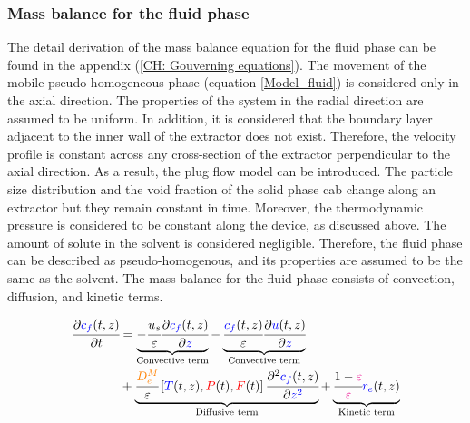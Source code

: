 \documentclass[../Article_Model_Parameters.tex]{subfiles}
\begin{document}
	\subsubsection{Mass balance for the fluid phase} \label{CH: Mass_balance_fluid}
	
	The detail derivation of the mass balance equation for the fluid phase can be found in the appendix (\ref{CH: Gouverning equations}). The movement of the mobile pseudo-homogeneous phase (equation \ref{Model_fluid}) is considered only in the axial direction. The properties of the system in the radial direction are assumed to be uniform. In addition, it is considered that the boundary layer adjacent to the inner wall of the extractor does not exist. Therefore, the velocity profile is constant across any cross-section of the extractor perpendicular to the axial direction. As a result, the plug flow model  can be introduced. The particle size distribution and the void fraction of the solid phase cab change along an extractor but they remain constant in time. Moreover, the thermodynamic pressure is considered to be constant along the device, as discussed above. The amount of solute in the solvent is considered negligible. Therefore, the fluid phase can be described as pseudo-homogenous, and its properties are assumed to be the same as the solvent. The mass balance for the fluid phase consists of convection, diffusion, and kinetic terms.
	
	
	{\footnotesize
		\begin{align} 
			\label{Model_fluid}
			\cfrac{\partial {\color{blue}c_f}(t,z)}{\partial t} &	=  \underbrace{- \cfrac{u_s}{\varepsilon} \cfrac{\partial {\color{blue}c_f}(t,z)}{\partial {\color{blue}z}}}_{\text{Convective term}} - \underbrace{ \cfrac{ {\color{blue}c_f}(t,z) }{\varepsilon} \cfrac{\partial {\color{blue}u}(t,z)}{\partial {\color{blue}z}}}_{\text{Convective term}} \nonumber \\
			&+ \underbrace{ \cfrac{ {\color{orange}D^M_e} }{\varepsilon} \left[{\color{blue}T}(t,z),{\color{red}P}(t),{\color{red}F}(t)\right] \cfrac{\partial^2 {\color{blue}c_f}(t,z)}{\partial {\color{blue}z^2}} }_{\text{Diffusive term}} 
			+ \underbrace{ \cfrac{1-{\color{magenta}\varepsilon}}{{\color{magenta}\varepsilon}} {\color{blue}r_e}(t,z) }_{\text{Kinetic term}}
	\end{align} }
	
\end{document}
